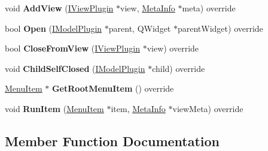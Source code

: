 \begin{DoxyCompactItemize}
\item 
void {\bfseries Add\+View} (\hyperlink{class_i_view_plugin}{I\+View\+Plugin} $\ast$view, \hyperlink{struct_meta_info}{Meta\+Info} $\ast$meta) override\hypertarget{class_main_menu_model_plugin_a20caa43ea363917184f39482847b213b}{}\label{class_main_menu_model_plugin_a20caa43ea363917184f39482847b213b}

\item 
bool {\bfseries Open} (\hyperlink{class_i_model_plugin}{I\+Model\+Plugin} $\ast$parent, Q\+Widget $\ast$parent\+Widget) override\hypertarget{class_main_menu_model_plugin_aee58baef527acb659083fa349b96484f}{}\label{class_main_menu_model_plugin_aee58baef527acb659083fa349b96484f}

\item 
bool {\bfseries Close\+From\+View} (\hyperlink{class_i_view_plugin}{I\+View\+Plugin} $\ast$view) override\hypertarget{class_main_menu_model_plugin_a100f1154fc462268747294da601c377a}{}\label{class_main_menu_model_plugin_a100f1154fc462268747294da601c377a}

\item 
void {\bfseries Child\+Self\+Closed} (\hyperlink{class_i_model_plugin}{I\+Model\+Plugin} $\ast$child) override\hypertarget{class_main_menu_model_plugin_ac35d70a13e7e8b369fb974b6da5d666c}{}\label{class_main_menu_model_plugin_ac35d70a13e7e8b369fb974b6da5d666c}

\item 
\hyperlink{struct_i_main_menu_plugin_model_1_1_menu_item}{Menu\+Item} $\ast$ {\bfseries Get\+Root\+Menu\+Item} () override\hypertarget{class_main_menu_model_plugin_ab46eb80afb80657bd136bcb52a5e978d}{}\label{class_main_menu_model_plugin_ab46eb80afb80657bd136bcb52a5e978d}

\item 
void {\bfseries Run\+Item} (\hyperlink{struct_i_main_menu_plugin_model_1_1_menu_item}{Menu\+Item} $\ast$item, \hyperlink{struct_meta_info}{Meta\+Info} $\ast$view\+Meta) override\hypertarget{class_main_menu_model_plugin_a837efbbcf266a09a49f4b4987a485b10}{}\label{class_main_menu_model_plugin_a837efbbcf266a09a49f4b4987a485b10}

\end{DoxyCompactItemize}


\subsection{Member Function Documentation}

